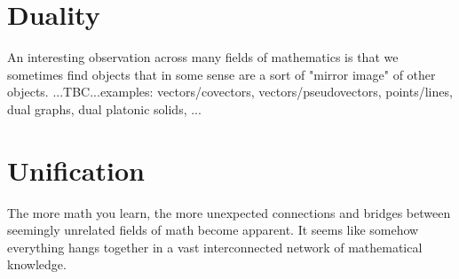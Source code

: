 
%

\section{Duality}
An interesting observation across many fields of mathematics is that we sometimes find objects that in some sense are a sort of "mirror image" of other objects. ...TBC...examples: vectors/covectors, vectors/pseudovectors, points/lines, dual graphs, dual platonic solids, ...




%

\section{Unification}
The more math you learn, the more unexpected connections and bridges between seemingly unrelated fields of math become apparent. It seems like somehow everything hangs together in a vast interconnected network of mathematical knowledge. 

